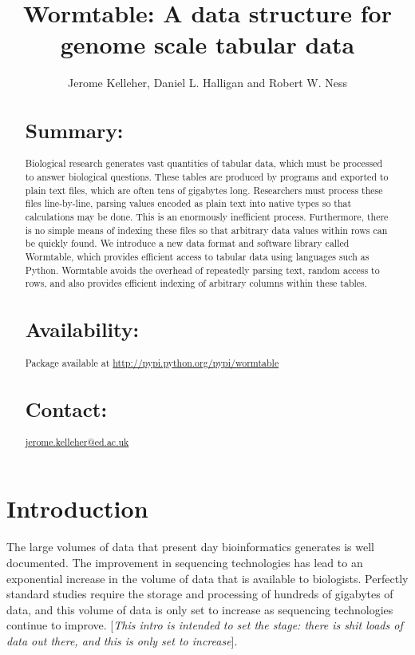 \documentclass{bioinfo}
\begin{document}

\title[Wormtable]{Wormtable: A data structure for genome scale tabular data}
\author[Kelleher \textit{et~al}]{Jerome Kelleher, Daniel L. Halligan 
    and Robert W. Ness }
\address{
University of Edinburgh,
King's Buildings,
West Mains Road,
EH9 3JT,
UK
}



\maketitle

\begin{abstract}
\section{Summary:}
Biological research generates vast quantities of tabular data, which must 
be processed to answer biological questions. These tables are produced by 
programs and exported to plain text files, which are often tens of gigabytes
long. Researchers must process these files 
line-by-line, parsing values encoded as plain text into native types so that 
calculations may be done. This is an enormously inefficient process.
Furthermore, there is no simple means of indexing these files so that 
arbitrary data values within rows can be quickly found. We introduce a new 
data format and software library called Wormtable, which provides efficient 
access to tabular data using languages such as Python. Wormtable avoids the 
overhead of repeatedly parsing text, random access to rows, 
and also provides efficient indexing of arbitrary columns within these tables.
\section{Availability:}
Package available at 
\href{http://pypi.python.org/pypi/wormtable}{http://pypi.python.org/pypi/wormtable}

\section{Contact:} \href{jerome.kelleher@ed.ac.uk}{jerome.kelleher@ed.ac.uk}
\end{abstract}

\section{Introduction}
The large volumes of data that present day bioinformatics generates 
is well documented. The improvement in sequencing technologies has
lead to an exponential increase in the volume of data that is available 
to biologists. Perfectly standard studies require the storage and processing 
of hundreds of gigabytes of data, and this volume of data is only set to 
increase as sequencing technologies continue to improve. [\emph{This 
intro is intended to set the stage: there is shit loads of data out there,
and this is only set to increase}].
\end{document}
